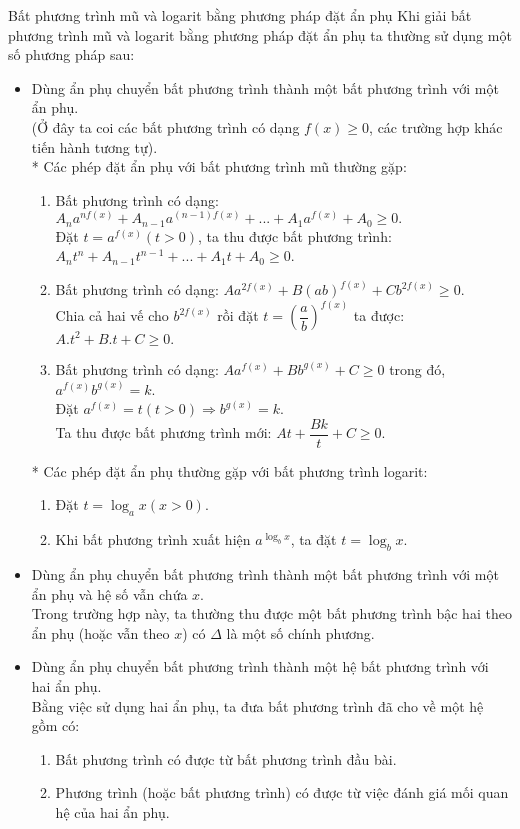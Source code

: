 \begin{dang}{Bất phương trình mũ và logarit bằng phương pháp đặt ẩn phụ}
	Khi giải bất phương trình mũ và logarit bằng phương pháp đặt ẩn phụ ta thường sử dụng một số phương pháp sau:
	\begin{itemize}
		\item Dùng ẩn phụ chuyển bất phương trình thành một bất phương trình với một ẩn phụ.\\
		(Ở đây ta coi các bất phương trình có dạng $f(x) \ge 0$, các trường hợp khác tiến hành tương tự).\\
		* Các phép đặt ẩn phụ với bất phương trình mũ thường gặp:
		\begin{enumerate}[+)]
			\item Bất phương trình có dạng: ${A_n}{a^{nf(x)}} + {A_{n - 1}}{a^{(n - 1)f(x)}} + ... + {A_1}{a^{f(x)}} + {A_0} \ge 0.$\\
			Đặt $t=a^{f(x)} (t>0)$, ta thu được bất phương trình: ${A_n}{t^n} + {A_{n - 1}}{t^{n - 1}} + ... + {A_1}t + {A_0} \ge 0$.
			\item Bất phương trình có dạng: $A{a^{2f(x)}} + B{{(ab)}^{f(x)}} + C{b^{2f(x)}} \ge 0.$\\
			Chia cả hai vế cho $b^{2f(x)}$ rồi đặt $t=\left(\dfrac{a}{b}\right)^{f(x)}$ ta được: $A.t^2+B.t+C\ge 0.$
			\item Bất phương trình có dạng: $A{a^{f(x)}} + B{b}^{g(x)} + C \ge 0$ trong đó, $a^{f(x)}b^{g(x)}=k$.\\
			Đặt $a^{f(x)}=t (t>0) \Rightarrow b^{g(x)}=k$.\\
			Ta thu được bất phương trình mới: $At+\dfrac{Bk}{t}+C \ge 0.$
		\end{enumerate}
		* Các phép đặt ẩn phụ thường gặp với bất phương trình logarit:
		\begin{enumerate}[+)]
			\item Đặt $t=\log_a{x} (x>0)$.
			\item Khi bất phương trình xuất hiện $a^{\log_b{x}}$, ta đặt $t=\log_b{x}$.
		\end{enumerate}
		\item Dùng ẩn phụ chuyển bất phương trình thành một bất phương trình với một ẩn phụ và hệ số vẫn chứa $x$.\\
		Trong trường hợp này, ta thường thu được một bất phương trình bậc hai theo ẩn phụ (hoặc vẫn theo $x$) có $\Delta$ là một số chính phương. 
		\item Dùng ẩn phụ chuyển bất phương trình thành một hệ bất phương trình với hai ẩn phụ.\\
		Bằng việc sử dụng hai ẩn phụ, ta đưa bất phương trình đã cho về một hệ gồm có:
		\begin{enumerate}[+)]
			\item Bất phương trình có được từ bất phương trình đầu bài.
			\item Phương trình (hoặc bất phương trình) có được từ việc đánh giá mối quan hệ của hai ẩn phụ.
		\end{enumerate}
	\end{itemize}
\end{dang}
